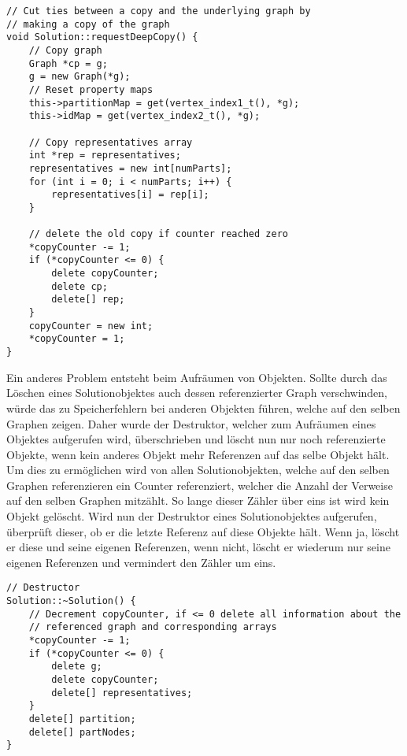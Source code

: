 \singlespacing
\begin{lstlisting}[caption={Die Methode \texttt{requestDeepCopy} der Solution Klasse},label={lst:deepcopy}]
// Cut ties between a copy and the underlying graph by 
// making a copy of the graph
void Solution::requestDeepCopy() {
	// Copy graph
	Graph *cp = g;
	g = new Graph(*g);
	// Reset property maps
	this->partitionMap = get(vertex_index1_t(), *g);
	this->idMap = get(vertex_index2_t(), *g);

	// Copy representatives array
	int *rep = representatives;
	representatives = new int[numParts];
	for (int i = 0; i < numParts; i++) {
		representatives[i] = rep[i];
	}

	// delete the old copy if counter reached zero
	*copyCounter -= 1;
	if (*copyCounter <= 0) {
		delete copyCounter;
		delete cp;
		delete[] rep;
	}
	copyCounter = new int;
	*copyCounter = 1;
}
\end{lstlisting}

Ein anderes Problem entsteht beim Aufräumen von Objekten. Sollte durch das Löschen eines Solutionobjektes auch dessen referenzierter Graph verschwinden, würde das zu Speicherfehlern bei anderen Objekten führen, 
welche auf den selben Graphen zeigen. Daher wurde der Destruktor, welcher zum Aufräumen eines Objektes aufgerufen wird, überschrieben und löscht nun nur noch referenzierte Objekte, wenn kein anderes Objekt
mehr Referenzen auf das selbe Objekt hält. Um dies zu ermöglichen wird von allen Solutionobjekten, welche auf den selben Graphen referenzieren ein Counter referenziert, welcher die Anzahl der
Verweise auf den selben Graphen mitzählt. So lange dieser Zähler über eins ist wird kein Objekt gelöscht. Wird nun der Destruktor eines Solutionobjektes aufgerufen, überprüft dieser, ob er die letzte
Referenz auf diese Objekte hält. Wenn ja, löscht er diese und seine eigenen Referenzen, wenn nicht, löscht er wiederum nur seine eigenen Referenzen und vermindert den Zähler um eins.

\singlespacing
\begin{lstlisting}[caption={Der Destruktor der Solutionklasse mit Rücksichtnahme auf eventuelle verbleibende Referenzen},label={lst:destruct}]
// Destructor
Solution::~Solution() {
	// Decrement copyCounter, if <= 0 delete all information about the 
	// referenced graph and corresponding arrays
	*copyCounter -= 1;
	if (*copyCounter <= 0) {
		delete g;
		delete copyCounter;
		delete[] representatives;
	}
	delete[] partition;
	delete[] partNodes;
}
\end{lstlisting}

